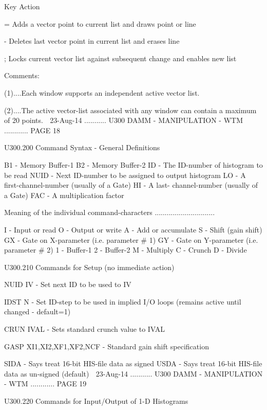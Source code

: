    Key      Action
 
   =        Adds a vector point to current list and draws point or line
 
   -        Deletes last vector point in current list and erases line
 
   ;        Locks current vector list against subsequent change and
            enables new list
 
   Comments:
 
   (1)....Each window supports an independent active vector list.
 
   (2)....The active vector-list associated with  any  window  can  contain  a
          maximum of 20 points.
    
   23-Aug-14 ........... U300  DAMM - MANIPULATION - WTM ............ PAGE  18
 
   U300.200  Command Syntax - General Definitions
 
   B1   - Memory Buffer-1
   B2   - Memory Buffer-2
   ID   - The  ID-number of histogram to be read
   NUID - Next ID-number to be assigned to output histogram
   LO   - A first-channel-number (usually of a Gate)
   HI   - A last- channel-number (usually of a Gate)
   FAC  - A multiplication factor
 
   Meaning of the individual command-characters ..............................
 
   I    - Input  or read
   O    - Output or write
   A    - Add or accumulate
   S    - Shift (gain shift)
   GX   - Gate on X-parameter (i.e. parameter # 1)
   GY   - Gate on Y-parameter (i.e. parameter # 2)
   1    - Buffer-1
   2    - Buffer-2
   M    - Multiply
   C    - Crunch
   D    - Divide
 
   U300.210  Commands for Setup (no immediate action)
 
   NUID IV    - Set next ID to be used to IV
 
   IDST N     - Set ID-step to be used in implied I/O loops
                (remains active until changed - default=1)
 
   CRUN IVAL  - Sets standard crunch value to IVAL
 
   GASP XI1,XI2,XF1,XF2,NCF - Standard gain shift specification
 
   SIDA       - Says treat 16-bit HIS-file data as signed
   USDA       - Says treat 16-bit HIS-file data as un-signed (default)
    
   23-Aug-14 ........... U300  DAMM - MANIPULATION - WTM ............ PAGE  19
 
   U300.220  Commands for Input/Output of 1-D Histograms
 
